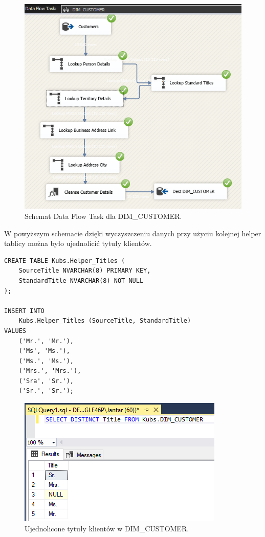 \documentclass[a4paper,12pt]{article}
\begin{document}
\begin{figure}[H]
    \centering
    \includegraphics[width=\textwidth]{images/5_customer.png}
    \caption{Schemat Data Flow Task dla DIM\_CUSTOMER.}
    \label{fig:zad5_dft_other_dim}
\end{figure}

W powyższym schemacie dzięki wyczyszczeniu danych przy użyciu kolejnej helper tablicy można było ujednolicić tytuły klientów.

\begin{lstlisting}
CREATE TABLE Kubs.Helper_Titles (
    SourceTitle NVARCHAR(8) PRIMARY KEY,
    StandardTitle NVARCHAR(8) NOT NULL
);

INSERT INTO
    Kubs.Helper_Titles (SourceTitle, StandardTitle)
VALUES
    ('Mr.', 'Mr.'),
    ('Ms', 'Ms.'),
    ('Ms.', 'Ms.'),
    ('Mrs.', 'Mrs.'),
    ('Sra', 'Sr.'),
    ('Sr.', 'Sr.');
\end{lstlisting}

\begin{figure}[H]
    \centering
    \includegraphics[width=\textwidth]{images/5_lookup_fix.png}
    \caption{Ujednolicone tytuły klientów w DIM\_CUSTOMER.}
    \label{fig:zad5_dft_other_dim_fixed}
\end{figure}
\end{document}
